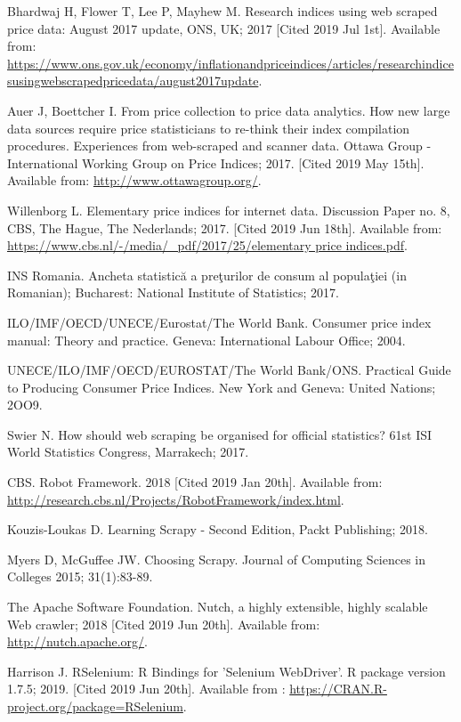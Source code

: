 \documentclass[]{article}
\begin{document}
\begin{thebibliography}{99}
Bhardwaj H, Flower T, Lee P, Mayhew M. Research indices using web scraped price data: August 2017 update, ONS, UK; 2017 [Cited 2019 Jul 1st]. Available from:
\url{https://www.ons.gov.uk/economy/inflationandpriceindices/articles/researchindicesusingwebscrapedpricedata/august2017update}.

Auer J, Boettcher I. From price collection to price data analytics. How new large data sources require price statisticians to re-think their index compilation procedures. Experiences from web-scraped and scanner data.
Ottawa Group - International Working Group on Price Indices; 2017. [Cited 2019 May 15th]. Available from: \url{http://www.ottawagroup.org/}.

Willenborg L. Elementary price indices for internet data. Discussion Paper no. 8, CBS, The Hague, The Nederlands; 2017. [Cited 2019 Jun 18th]. Available from:
\url{https://www.cbs.nl/-/media/_pdf/2017/25/elementary price indices.pdf}.

INS Romania. Ancheta statistică a preţurilor de consum al populaţiei (in Romanian); Bucharest: National Institute of Statistics; 2017.

ILO/IMF/OECD/UNECE/Eurostat/The World Bank. Consumer price index manual: Theory and practice. Geneva: International Labour Office; 2004.

UNECE/ILO/IMF/OECD/EUROSTAT/The World Bank/ONS. Practical Guide to Producing Consumer Price Indices. New York and Geneva: United Nations; 2OO9.

Swier N. How should web scraping be organised for official statistics? 61st ISI World Statistics Congress, Marrakech; 2017.

CBS. Robot Framework. 2018 [Cited 2019 Jan 20th]. Available from: \url{http://research.cbs.nl/Projects/RobotFramework/index.html}.

Kouzis-Loukas D. Learning Scrapy - Second Edition, Packt Publishing; 2018.

Myers D, McGuffee JW. Choosing Scrapy. Journal of Computing Sciences in Colleges 2015; 31(1):83-89.

The Apache Software Foundation. Nutch, a highly extensible, highly scalable Web crawler; 2018 [Cited 2019 Jun 20th]. Available from:
\url{http://nutch.apache.org/}.

Harrison J. RSelenium: R Bindings for 'Selenium WebDriver'. R package version 1.7.5; 2019. [Cited 2019 Jun 20th]. Available from :
\url{https://CRAN.R-project.org/package=RSelenium}.


\end{thebibliography}
\end{document}
